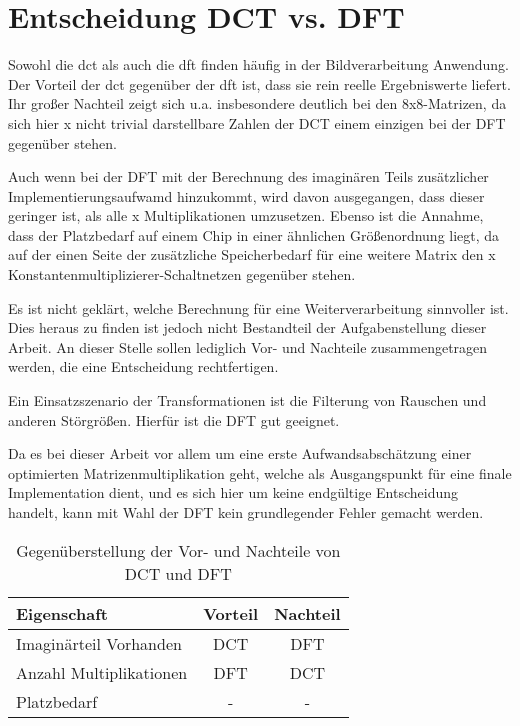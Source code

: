  \section{Entscheidung DCT vs. DFT}
 Sowohl die \gls{dct} als auch die \gls{dft} finden häufig in der Bildverarbeitung Anwendung. Der Vorteil der \gls{dct} gegenüber der \gls{dft} ist,
 dass sie rein reelle Ergebniswerte liefert. Ihr großer Nachteil zeigt sich u.a. insbesondere deutlich bei den 8x8-Matrizen, da sich hier x 
 nicht trivial darstellbare Zahlen der DCT einem einzigen bei der DFT gegenüber stehen.
 
 Auch wenn bei der DFT mit der Berechnung des imaginären Teils zusätzlicher Implementierungsaufwamd hinzukommt, wird davon ausgegangen, dass dieser geringer ist, 
 als alle x Multiplikationen umzusetzen. Ebenso ist die Annahme, dass der Platzbedarf auf einem Chip in einer ähnlichen Größenordnung liegt, da auf der einen Seite
 der zusätzliche Speicherbedarf für eine weitere Matrix den x Konstantenmultiplizierer-Schaltnetzen gegenüber stehen.
 
 Es ist nicht geklärt, welche Berechnung für eine Weiterverarbeitung sinnvoller ist. Dies heraus zu finden ist jedoch nicht Bestandteil der Aufgabenstellung dieser Arbeit.
 An dieser Stelle sollen lediglich Vor- und Nachteile zusammengetragen werden, die eine Entscheidung rechtfertigen.
 
 Ein Einsatzszenario der Transformationen ist die Filterung von Rauschen und anderen Störgrößen. Hierfür ist die DFT gut geeignet. 
 
 
 Da es bei dieser Arbeit vor allem um eine erste Aufwandsabschätzung einer optimierten Matrizenmultiplikation geht, welche als Ausgangspunkt für eine finale Implementation 
 dient, und es sich hier um keine endgültige Entscheidung handelt, kann mit Wahl der DFT kein grundlegender Fehler gemacht werden.
 
 
 \begin{table}[ht]
 \centering
  \caption{Gegenüberstellung der Vor- und Nachteile von DCT und DFT}
  \begin{tabular}{lcc}
  \hline
      Eigenschaft          & Vorteil   & Nachteil\\
  \hline
   Imaginärteil Vorhanden  & DCT       & DFT \\
   Anzahl Multiplikationen & DFT       & DCT\\
   Platzbedarf             &  -        &  - \\
   \hline
  \end{tabular}
  \label{tab:gegenüberstellung_dct_dft}
 \end{table}
